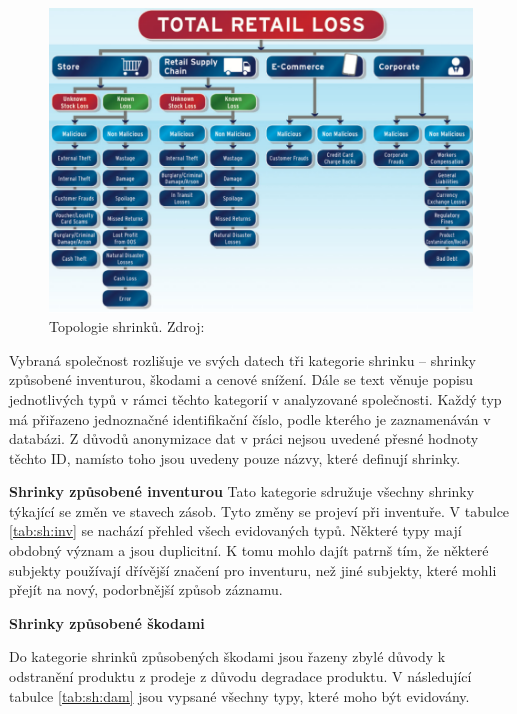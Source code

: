 \begin{figure}[hbtp!]
    \centering
    \captionsetup{justification=centering}
    \includegraphics[width=\textwidth]{obrazky/typyshirnku.png}
    \caption{Topologie shrinků. Zdroj: \cite{bib:shrink2}}
    \label{obr:shrinkytypyBeck}
\end{figure}

Vybraná společnost rozlišuje ve svých datech tři kategorie shrinku -- shrinky způsobené inventurou, škodami a cenové snížení. Dále se text věnuje popisu jednotlivých typů v rámci těchto kategorií v analyzované společnosti. Každý typ má přiřazeno jednoznačné identifikační číslo, podle kterého je zaznamenáván v databázi. Z důvodů anonymizace dat v práci nejsou uvedené přesné hodnoty těchto ID, namísto toho jsou uvedeny pouze názvy, které definují shrinky.

\vspace*{1em}

\textbf{Shrinky způsobené inventurou}
Tato kategorie sdružuje všechny shrinky týkající se změn ve stavech zásob. Tyto změny se projeví při inventuře. V tabulce \ref*{tab:sh:inv} se nachází přehled všech evidovaných typů. Některé typy mají obdobný význam a jsou duplicitní. K tomu mohlo dajít patrnš tím, že některé subjekty používají dřívější značení pro inventuru, než jiné subjekty, které mohli přejít na nový, podorbnější způsob záznamu. 

\vspace*{1em}

\textbf{Shrinky způsobené škodami}

Do kategorie shrinků způsobených škodami jsou řazeny zbylé důvody k odstranění produktu z prodeje z důvodu degradace produktu. V následující tabulce \ref{tab:sh:dam} jsou vypsané všechny typy, které moho být evidovány.

